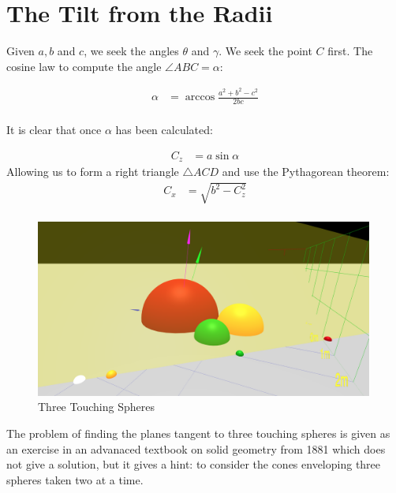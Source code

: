 \documentclass{article}
\begin{document}
\section{The Tilt from the Radii}

Given $a,b$ and $c$, we seek the angles $\theta$ and $\gamma$.
We seek the  point $C$ first.
The cosine law to compute the angle $\angle ABC = \alpha$:

\begin{align}
  \alpha  &= \arccos{\frac{a^2 + b^2 - c^2}{2bc}} \\
\end{align}

It is clear that once $\alpha$ has been calculated:

\begin{align}
 C_z  &= a\sin{\alpha}
\end{align}
Allowing us to form a right triangle $\triangle ACD$ and use the Pythagorean theorem:
\begin{align}
  C_x   &= \sqrt{b^2 - C_z^2}  \\
\end{align}



\begin{figure}
     \centering
     \includegraphics[width=0.99\textwidth]{figures/StandardThreeSphereDiagram.png}
     \caption{Three Touching Spheres}
  \label{fig:fixed}
\end{figure}

The problem of finding the planes tangent to three touching spheres
is given as an exercise in an advanaced textbook on solid geometry from 1881\cite{payne1881} which does not give a solution,
but it gives a hint: to consider the cones enveloping
three spheres taken two at a time.
\end{document}
